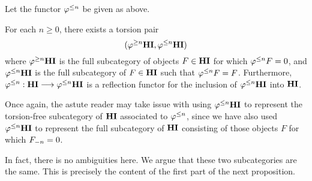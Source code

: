 \begin{cor}
Let the functor $\tlHI{n}$ be given as above.

For each $n \geq 0$, there exists a torsion pair
\[
(\tgHI{n}\HI, \tlHI{n}\HI)
\]
where $\tgHI{n}\HI$ is the full subcategory of objects $F \in \HI$
for which $\tlHI{n} F = 0$, and $\tlHI{n}\HI$ is the full 
subcategory of $F \in \HI$ such that $\tlHI{n} F = F$. Furthermore, 
$\tlHI{n} : \HI \to \tlHI{n}\HI$ is a reflection functor for the
inclusion of $\tlHI{n} \HI$ into $\HI$.
\end{cor}

\begin{rmk}
Once again, the astute reader may take issue with using $\tlHI{n} 
\HI$ to represent the torsion-free subcategory of $\HI$ associated
to $\tlHI{n}$, since we have also used $\tlHI{n} \HI$ to represent
the full subcategory of $\HI$ consisting of those objects $F$ for
which $\RHI[n]{F} = 0$.

In fact, there is no ambiguities here. We argue that these two 
subcategories are the same. This is precisely the content of the
first part of the next proposition.
\end{rmk}

